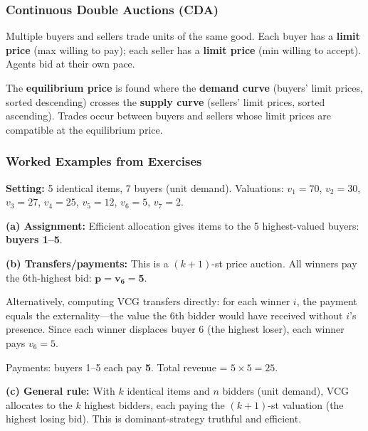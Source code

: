 \separator

\subsubsection{Continuous Double Auctions (CDA)}

\begin{defbox}
Multiple buyers and sellers trade units of the same good. Each buyer has a \textbf{limit price} (max willing to pay); each seller has a \textbf{limit price} (min willing to accept). Agents bid at their own pace.

The \textbf{equilibrium price} is found where the \textbf{demand curve} (buyers' limit prices, sorted descending) crosses the \textbf{supply curve} (sellers' limit prices, sorted ascending). Trades occur between buyers and sellers whose limit prices are compatible at the equilibrium price.
\end{defbox}

\separator

\subsubsection{Worked Examples from Exercises}

\begin{exbox}
\textbf{Setting:} 5 identical items, 7 buyers (unit demand). Valuations: $v_1 = 70$, $v_2 = 30$, $v_3 = 27$, $v_4 = 25$, $v_5 = 12$, $v_6 = 5$, $v_7 = 2$.

\textbf{(a) Assignment:} Efficient allocation gives items to the 5 highest-valued buyers: \textbf{buyers 1--5}.

\textbf{(b) Transfers/payments:} This is a $(k{+}1)$-st price auction. All winners pay the 6th-highest bid: $\mathbf{p = v_6 = 5}$.

Alternatively, computing VCG transfers directly: for each winner $i$, the payment equals the externality---the value the 6th bidder would have received without $i$'s presence. Since each winner displaces buyer 6 (the highest loser), each winner pays $v_6 = 5$.

Payments: buyers 1--5 each pay \textbf{5}. Total revenue = $5 \times 5 = 25$.

\textbf{(c) General rule:} With $k$ identical items and $n$ bidders (unit demand), VCG allocates to the $k$ highest bidders, each paying the $(k{+}1)$-st valuation (the highest losing bid). This is dominant-strategy truthful and efficient.
\end{exbox}


